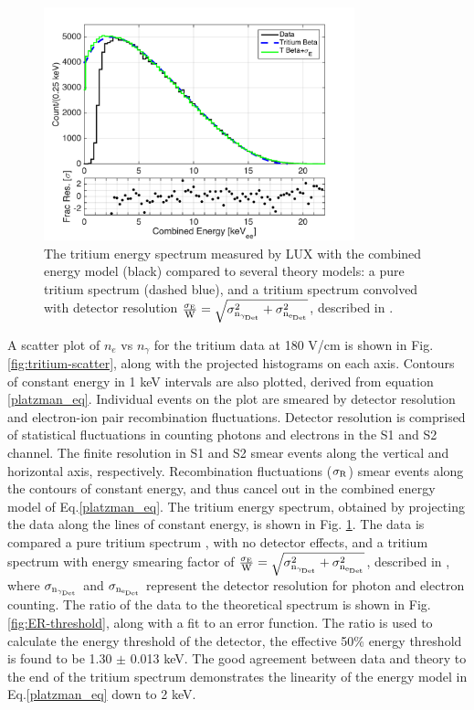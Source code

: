 \begin{figure}[h!]
\begin{center}
\includegraphics[width=90mm]{fig/tritium-spectrum-linear.png}
\caption{The tritium energy spectrum measured by LUX with the combined energy model (black) compared to several theory models: a pure tritium spectrum (dashed blue), and a tritium spectrum convolved with detector resolution  $\rm \frac{\sigma_E}{W} = \sqrt{\sigma_{n_{\gamma_{Det}}}^2 + \sigma_{n_{e_{Det}}}^2}$, described in \cite{Dobi_Thesis}. }
\label{fig:tritium-spectrum}
\end{center}
\end{figure}


A scatter plot of $n_e$ vs $n_{\gamma}$ for the tritium data at 180 V/cm is shown in Fig. \ref{fig:tritium-scatter}, along with the projected histograms on each axis. Contours of constant energy in 1 keV intervals are also plotted, derived from equation \ref{platzman_eq}. Individual events on the plot are smeared by detector resolution and electron-ion pair recombination fluctuations. Detector resolution is comprised of statistical fluctuations in counting photons and electrons in the S1 and S2 channel. The finite resolution in S1 and S2 smear events along the vertical and horizontal axis, respectively. Recombination fluctuations ($\rm \sigma_R$) smear events along the contours of constant energy, and thus cancel out in the combined energy model of Eq.\ref{platzman_eq}. The tritium energy spectrum, obtained by projecting the data along the lines of constant energy, is shown in Fig. \ref{fig:tritium-spectrum}. The data is compared a pure tritium spectrum \cite{Tritium_Eq_Simpson}, with no detector effects, and a tritium spectrum with energy smearing factor of $\rm \frac{\sigma_E}{W} = \sqrt{\sigma_{n_{\gamma_{Det}}}^2 + \sigma_{n_{e_{Det}}}^2}$, described in \cite{Dobi_Thesis}, where $\rm \sigma_{n_{\gamma_{Det}}}$ and $\rm \sigma_{n_{e_{Det}}}$ represent the detector resolution for photon and electron counting. The ratio of the data to the theoretical spectrum is shown in Fig. \ref{fig:ER-threshold}, along with a fit to an error function. The ratio is used to calculate the energy threshold of the detector, the effective 50\% energy threshold is found to be 1.30 $\pm$ 0.013 keV. The good agreement between data and theory to the end of the tritium spectrum demonstrates the linearity of the energy model in Eq.\ref{platzman_eq} down to 2 keV.

